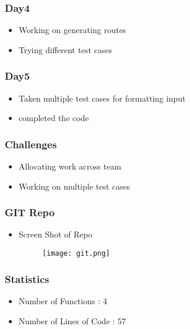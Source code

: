\documentclass{beamer}
\begin{document}
    \begin{frame}
     \frametitle{Day4} 
   \begin{itemize}
     \item Working on generating routes
     \item Trying different test cases
     \end{itemize}
     \end{frame}
      \begin{frame}
    \frametitle{Day5}
    \begin{itemize}
        \item Taken multiple test cases for formatting input
        \item completed the code
    \end{itemize}
        
    \end{frame}

    \begin{frame}
	\frametitle{Challenges}
        \begin{itemize}
	    
	    \item Allocating work across team
	    \item Working on multiple test cases
        \end{itemize}
    \end{frame}
    \begin{frame}
	\frametitle{GIT Repo}
	\begin{itemize}
		\item Screen Shot of Repo
		\begin{figure}[htp]
    \centering
    \texttt{[image: git.png]}
    
\end{figure}
	\end{itemize}
    \end{frame}
    \begin{frame}
	\frametitle{Statistics}
       \begin{itemize}
       \item Number of Functions : 4
	    \item Number of Lines of Code : 57
	   
       \end{itemize}
   \end{frame}
    
\end{document}
